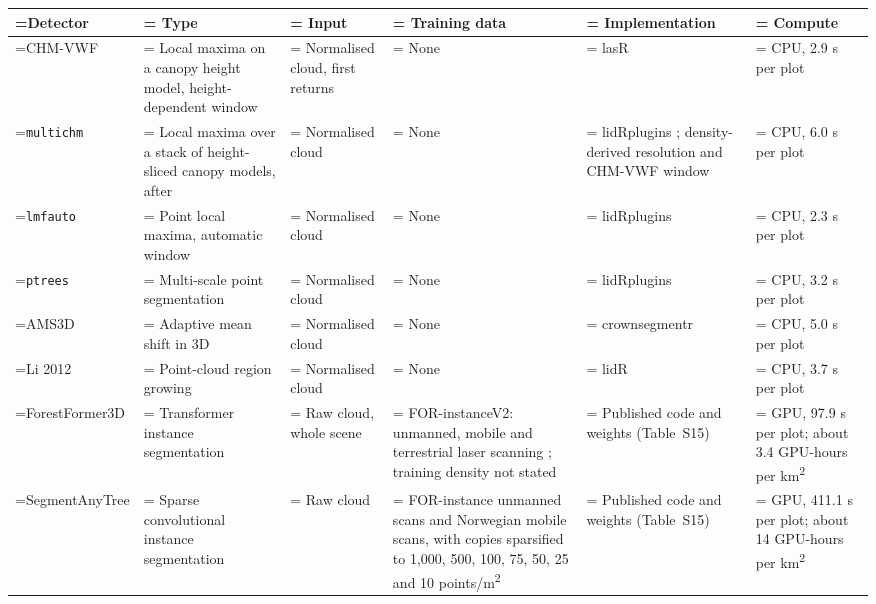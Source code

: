 \documentclass[preprint,12pt,authoryear,a4paper]{elsarticle}
\begin{document}
\begin{table}[!htbp]
\centering
{\scriptsize
\setlength{\tabcolsep}{3pt}
\renewcommand{\arraystretch}{1.15}
\begin{tabularx}{\linewidth}{>{\hsize\linewidth=\hsize}L>{\hsize\linewidth=\hsize}L>{\hsize\linewidth=\hsize}L>{\hsize\linewidth=\hsize}L>{\hsize\linewidth=\hsize}L>{\hsize\linewidth=\hsize}L}
\toprule
Detector & Type & Input & Training data & Implementation & Compute \\
\midrule
CHM-VWF & Local maxima on a canopy height model, height-dependent window \citep{popescu2004seeing} & Normalised cloud, first returns & None & lasR \citep{roussel2026lasr} & CPU, 2.9 s per plot \\
\texttt{multichm} & Local maxima over a stack of height-sliced canopy models, after \citet{eysn2015benchmark} & Normalised cloud & None & lidRplugins \citep{roussel2023lidrplugins}; density-derived resolution and CHM-VWF window & CPU, 6.0 s per plot \\
\texttt{lmfauto} & Point local maxima, automatic window & Normalised cloud & None & lidRplugins & CPU, 2.3 s per plot \\
\texttt{ptrees} & Multi-scale point segmentation \citep{vega2014ptrees} & Normalised cloud & None & lidRplugins & CPU, 3.2 s per plot \\
AMS3D & Adaptive mean shift in 3D \citep{ferraz2016lidar} & Normalised cloud & None & crownsegmentr \citep{steinmeier2025crownsegmentr} & CPU, 5.0 s per plot \\
Li 2012 & Point-cloud region growing \citep{li2012new} & Normalised cloud & None & lidR \citep{roussel2020lidr} & CPU, 3.7 s per plot \\
ForestFormer3D & Transformer instance segmentation \citep{xiang2025forestformer3d} & Raw cloud, whole scene & FOR-instanceV2: unmanned, mobile and terrestrial laser scanning \citep{xiang2025forinstancev2}; training density not stated & Published code and weights (Table~S15) & GPU, 97.9 s per plot; about 3.4 GPU-hours per km\textsuperscript{2} \\
SegmentAnyTree & Sparse convolutional instance segmentation \citep{wielgosz2024segmentanytree} & Raw cloud & FOR-instance unmanned scans and Norwegian mobile scans, with copies sparsified to 1,000, 500, 100, 75, 50, 25 and 10 points/m\textsuperscript{2} & Published code and weights (Table~S15) & GPU, 411.1 s per plot; about 14 GPU-hours per km\textsuperscript{2} \\

\end{tabularx}}
\end{table}
\end{document}
